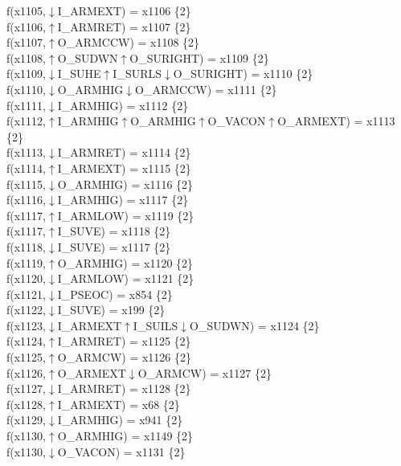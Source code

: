f(x1105,$\downarrow$I\_ARMEXT) = x1106 \{2\} \\  
f(x1106,$\uparrow$I\_ARMRET) = x1107 \{2\} \\  
f(x1107,$\uparrow$O\_ARMCCW) = x1108 \{2\} \\  
f(x1108,$\uparrow$O\_SUDWN$\uparrow$O\_SURIGHT) = x1109 \{2\} \\  
f(x1109,$\downarrow$I\_SUHE$\uparrow$I\_SURLS$\downarrow$O\_SURIGHT) = x1110 \{2\} \\  
f(x1110,$\downarrow$O\_ARMHIG$\downarrow$O\_ARMCCW) = x1111 \{2\} \\  
f(x1111,$\downarrow$I\_ARMHIG) = x1112 \{2\} \\  
f(x1112,$\uparrow$I\_ARMHIG$\uparrow$O\_ARMHIG$\uparrow$O\_VACON$\uparrow$O\_ARMEXT) = x1113 \{2\} \\  
f(x1113,$\downarrow$I\_ARMRET) = x1114 \{2\} \\  
f(x1114,$\uparrow$I\_ARMEXT) = x1115 \{2\} \\  
f(x1115,$\downarrow$O\_ARMHIG) = x1116 \{2\} \\  
f(x1116,$\downarrow$I\_ARMHIG) = x1117 \{2\} \\  
f(x1117,$\uparrow$I\_ARMLOW) = x1119 \{2\} \\  
f(x1117,$\uparrow$I\_SUVE) = x1118 \{2\} \\  
f(x1118,$\downarrow$I\_SUVE) = x1117 \{2\} \\  
f(x1119,$\uparrow$O\_ARMHIG) = x1120 \{2\} \\  
f(x1120,$\downarrow$I\_ARMLOW) = x1121 \{2\} \\  
f(x1121,$\downarrow$I\_PSEOC) = x854 \{2\} \\  
f(x1122,$\downarrow$I\_SUVE) = x199 \{2\} \\  
f(x1123,$\downarrow$I\_ARMEXT$\uparrow$I\_SUILS$\downarrow$O\_SUDWN) = x1124 \{2\} \\  
f(x1124,$\uparrow$I\_ARMRET) = x1125 \{2\} \\  
f(x1125,$\uparrow$O\_ARMCW) = x1126 \{2\} \\  
f(x1126,$\uparrow$O\_ARMEXT$\downarrow$O\_ARMCW) = x1127 \{2\} \\  
f(x1127,$\downarrow$I\_ARMRET) = x1128 \{2\} \\  
f(x1128,$\uparrow$I\_ARMEXT) = x68 \{2\} \\  
f(x1129,$\downarrow$I\_ARMHIG) = x941 \{2\} \\  
f(x1130,$\uparrow$O\_ARMHIG) = x1149 \{2\} \\  
f(x1130,$\downarrow$O\_VACON) = x1131 \{2\} \\  
